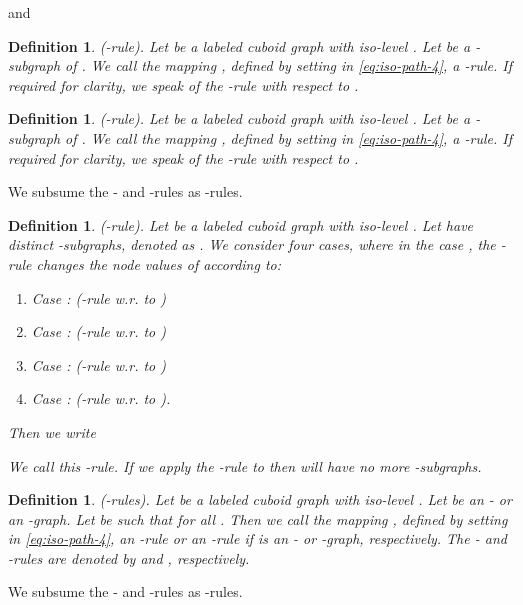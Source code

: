 \documentclass[a4paper,11pt]{article}
\newtheorem{definition}[theorem]{Definition}
\begin{document}
and


\begin{definition}(-rule). Let  be a labeled cuboid graph with iso-level
. Let  be a -subgraph of . We call the mapping
, defined by setting  in \eqref{eq:iso-path-4}, a -rule. If required for clarity,
we speak of the -rule with respect to .
\label{def:iso-path-6}
\end{definition}

\begin{definition}(-rule). Let  be a labeled cuboid graph with iso-level
. Let  be a -subgraph of . We call the mapping
, defined by setting  in \eqref{eq:iso-path-4}, a -rule. If required for clarity,
we speak of the -rule with respect to .
\label{def:iso-path-7}
\end{definition}
\noindent We subsume the - and -rules as -rules.

\begin{definition}(-rule). Let  be a labeled cuboid graph with iso-level
. Let  have  distinct -subgraphs, denoted as .  We consider four cases, where
in the case , the -rule changes the node values of  according to:
\begin{enumerate}
\item Case :  (-rule w.r. to )
\item Case :  (-rule w.r. to )
\item Case :  (-rule w.r. to )
\item Case :  (-rule w.r. to ).
\end{enumerate}
Then we write

We call this -rule. If we apply the -rule to  then 
will have no more -subgraphs.
\label{def:iso-path-star-map}
\end{definition}

\begin{definition}(-rules). Let  be a labeled cuboid graph with iso-level
. Let  be an - or an -graph. Let 
 be such that  for all . Then we call the mapping ,
defined by setting  in \eqref{eq:iso-path-4}, an -rule or an -rule if  is an
- or -graph, respectively. The - and -rules are denoted by  and ,
respectively.
\label{def:iso-path-8}
\end{definition}
\noindent We subsume the - and -rules as -rules.
\end{document}
